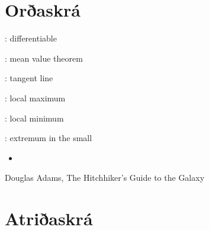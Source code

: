 \documentclass[b5paper,10pt,icelandic]{sphinxmanual}
\begin{document}
\chapter{Orðaskrá}
\label{\detokenize{ordaskra:oraskra}}\label{\detokenize{ordaskra::doc}}
 : differentiable


 : mean value theorem


 : tangent line

 : local maximum

 : local minimum

 : extremum in the small
\begin{itemize}
\item {} 

\end{itemize}


\textendash{} Douglas Adams, The Hitchhiker’s Guide to the Galaxy


\chapter{Atriðaskrá}
\renewcommand{\indexname}{Atriðaskrá}
\printindex
\end{document}
